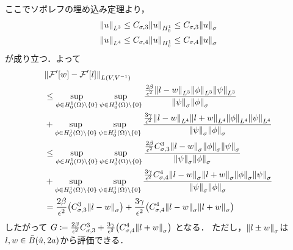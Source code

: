 ここでソボレフの埋め込み定理より，
\begin{align}
  \norm{u}_{L^3}\leq C_{\sigma,3} \norm{u}_{H^1_0}\leq C_{\sigma,3}\norm{u}_\sigma\\
  \norm{u}_{L^4}\leq C_{\sigma,4} \norm{u}_{H^1_0}\leq C_{\sigma,4}\norm{u}_\sigma\\
\end{align}
が成り立つ．よって
\begin{align}
  &\norm{\mathcal{F}'\qty[w]-\mathcal{F}'\qty[l]}_{L\qty(V,V^{-1})}\\
  &\leq
  \sup\limits_{\phi \in H^1_0(\Omega) \backslash \{ 0 \} }
  \sup\limits_{\psi \in H^1_0(\Omega) \backslash \{ 0 \} }
  \frac
  {\frac{2\beta}{\epsilon^2}\norm{l-w}_{L^3}\norm{\phi}_{L^3}\norm{\psi}_{L^3}}
  {\norm{\psi}_\sigma\norm{\phi}_\sigma}\\
  &+
  \sup\limits_{\phi \in H^1_0(\Omega) \backslash \{ 0 \} }
  \sup\limits_{\psi \in H^1_0(\Omega) \backslash \{ 0 \} }
  \frac
  {\frac{3\gamma}{\epsilon^2}\norm{l-w}_{L^4}\norm{l+w}_{L^4}\norm{\phi}_{L^4}\norm{\psi}_{L^4}}
  {\norm{\psi}_\sigma\norm{\phi}_\sigma}\\
  &\leq
  \sup\limits_{\phi \in H^1_0(\Omega) \backslash \{ 0 \} }
  \sup\limits_{\psi \in H^1_0(\Omega) \backslash \{ 0 \} }
  \frac
  {\frac{2\beta}{\epsilon^2}C^3_{\sigma,3}\norm{l-w}_\sigma\norm{\phi}_\sigma\norm{\psi}_\sigma}
  {\norm{\psi}_\sigma\norm{\phi}_\sigma}\\
  &+
  \sup\limits_{\phi \in H^1_0(\Omega) \backslash \{ 0 \} }
  \sup\limits_{\psi \in H^1_0(\Omega) \backslash \{ 0 \} }
  \frac
  {\frac{3\gamma}{\epsilon^2}C^4_{\sigma,4}\norm{l-w}_\sigma\norm{l+w}_\sigma\norm{\phi}_\sigma\norm{\psi}_\sigma}
  {\norm{\psi}_\sigma\norm{\phi}_\sigma}\\
  &=
  \frac{2\beta}{\epsilon^2}
  \qty(C^3_{\sigma,3}\norm{l-w}_\sigma)
  +
  \frac{3\gamma}{\epsilon^2}
  \qty(C^4_{\sigma,4}\norm{l-w}_\sigma\norm{l+w}_\sigma)
\end{align}
したがって
\(G\coloneqq \frac{2\beta}{\epsilon^2}
  C^3_{\sigma,3}+\frac{3\gamma}{\epsilon^2}\qty(C^4_{\sigma,4}\norm{l+w}_\sigma)\)
となる．
ただし，\(\norm{l\pm w}_\sigma\)は\(l,w\in \bar{B}\qty(\hat{u},2a)\)から評価できる．

